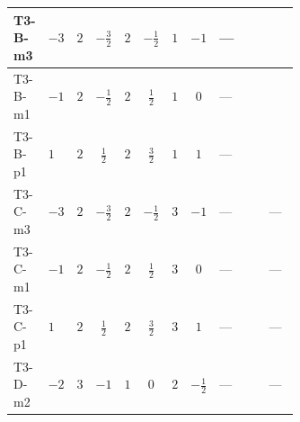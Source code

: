 \documentclass[8pt]{article}
\begin{document}
\begin{landscape}
\begin{longtable}{@{}llcccccc >{\raggedright\arraybackslash}p{0.21\linewidth} >{\raggedright\arraybackslash}p{0.21\linewidth} >{\raggedright\arraybackslash}p{0.21\linewidth}@{}}
\midrule
T3-B-m3 & $-3$ & $2$ & $-\frac{3}{2}$ & $2$ & $-\frac{1}{2}$ & $1$ & $-1$ & --- & \scriptsize\adjustbox{max width=\linewidth}{$\begin{gathered} +4 {\lambda_{12}^{(1)}} {m_1^2}\end{gathered}$} & \scriptsize\adjustbox{max width=\linewidth}{$\begin{gathered} {m_2^2} (2 T_{\nu}^{(2)}+6 {\lambda_{S_2}^{(1)}})\end{gathered}$} \\
\midrule
T3-B-m1 & $-1$ & $2$ & $-\frac{1}{2}$ & $2$ & $\frac{1}{2}$ & $1$ & $0$ & --- & \scriptsize\adjustbox{max width=\linewidth}{$\begin{gathered} +4 {\lambda_{12}^{(1)}} {m_1^2}\end{gathered}$} & \scriptsize\adjustbox{max width=\linewidth}{$\begin{gathered} {m_2^2} (2 T_{\nu}^{(2)}+6 {\lambda_{S_2}^{(1)}})\end{gathered}$} \\
\midrule
T3-B-p1 & $1$ & $2$ & $\frac{1}{2}$ & $2$ & $\frac{3}{2}$ & $1$ & $1$ & --- & \scriptsize\adjustbox{max width=\linewidth}{$\begin{gathered} +4 {\lambda_{12}^{(1)}} {m_1^2}\end{gathered}$} & \scriptsize\adjustbox{max width=\linewidth}{$\begin{gathered} {m_2^2} (2 T_{\nu}^{(2)}+6 {\lambda_{S_2}^{(1)}})\end{gathered}$} \\
\midrule
T3-C-m3 & $-3$ & $2$ & $-\frac{3}{2}$ & $2$ & $-\frac{1}{2}$ & $3$ & $-1$ & --- & \scriptsize\adjustbox{max width=\linewidth}{$\begin{gathered} +4 {\lambda_{12}^{(1)}} {m_1^2}\end{gathered}$} & --- \\
\midrule
T3-C-m1 & $-1$ & $2$ & $-\frac{1}{2}$ & $2$ & $\frac{1}{2}$ & $3$ & $0$ & --- & \scriptsize\adjustbox{max width=\linewidth}{$\begin{gathered} +4 {\lambda_{12}^{(1)}} {m_1^2}\end{gathered}$} & --- \\
\midrule
T3-C-p1 & $1$ & $2$ & $\frac{1}{2}$ & $2$ & $\frac{3}{2}$ & $3$ & $1$ & --- & \scriptsize\adjustbox{max width=\linewidth}{$\begin{gathered} +4 {\lambda_{12}^{(1)}} {m_1^2}\end{gathered}$} & --- \\
\midrule
T3-D-m2 & $-2$ & $3$ & $-1$ & $1$ & $0$ & $2$ & $-\frac{1}{2}$ & --- & \scriptsize\adjustbox{max width=\linewidth}{$\begin{gathered} +6 {\lambda_{12}^{(1)}} {m_1^2}\end{gathered}$} & --- \\

\end{longtable}
\end{landscape}
\end{document}
